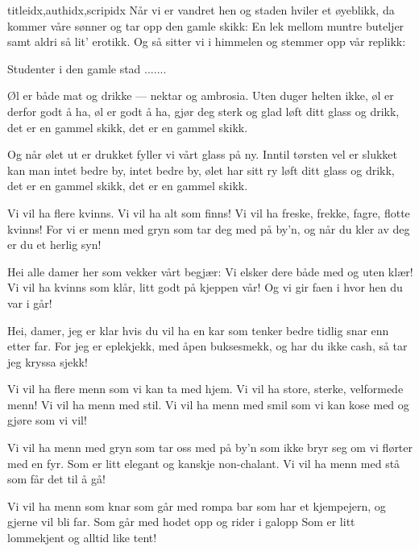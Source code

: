 \documentclass[14pt,letterpaper,norsk]{article}
\begin{document}
\begin{songs}{titleidx,authidx,scripidx}
\beginverse
Når vi er vandret hen og staden hviler et øyeblikk,
da kommer våre sønner og tar opp den gamle skikk:
En lek mellom muntre buteljer samt aldri så lit' erotikk.
Og så sitter vi i himmelen og stemmer opp vår replikk:
\endverse

\beginchorus
Studenter i den gamle stad .......
\endchorus
\endsong

\beginverse
Øl er både mat og drikke --- nektar og ambrosia.
Uten duger helten ikke, øl er derfor godt å ha,
øl er godt å ha, gjør deg sterk og glad
løft ditt glass og drikk, det er en gammel skikk,
det er en gammel skikk.
\endverse

\beginverse
Og når ølet ut er drukket fyller vi vårt glass på ny.
Inntil tørsten vel er slukket kan man intet bedre by,
intet bedre by, ølet har sitt ry
løft ditt glass og drikk, det er en gammel skikk, 
det er en gammel skikk.
\endverse
\endsong

\beginverse
Vi vil ha flere kvinns. 
Vi vil ha alt som finns! 
Vi vil ha freske, frekke, fagre, flotte kvinns! 
For vi er menn med gryn 
som tar deg med på by'n, 
og når du kler av deg 
er du et herlig syn! 
\endverse

\beginverse
Hei alle damer her 
som vekker vårt begjær: 
Vi elsker dere både med og uten klær! 
Vi vil ha kvinns som klår, 
litt godt på kjeppen vår! 
Og vi gir faen i hvor hen du var i går! 
\endverse

\beginverse
Hei, damer, jeg er klar 
hvis du vil ha en kar 
som tenker bedre tidlig snar enn etter far. 
For jeg er eplekjekk, 
med åpen buksesmekk, 
og har du ikke cash, 
så tar jeg kryssa sjekk! 
\endverse
\endsong

\beginverse
Vi vil ha flere menn
som vi kan ta med hjem.
Vi vil ha store, sterke, velformede menn!
Vi vil ha menn med stil.
Vi vil ha menn med smil
som vi kan kose med og gjøre som vi vil!
\endverse

\beginverse
Vi vil ha menn med gryn
som tar oss med på by'n
som ikke bryr seg om vi flørter med en fyr.
Som er litt elegant
og kanskje non-chalant.
Vi vil ha menn med stå som får det til å gå!
\endverse

\beginverse
Vi vil ha menn som knar
som går med rompa bar
som har et kjempejern, og gjerne vil bli far.
Som går med hodet opp
og rider i galopp
Som er litt lommekjent og alltid like tent!
\endverse
\endsong



\end{songs}
\end{document}
